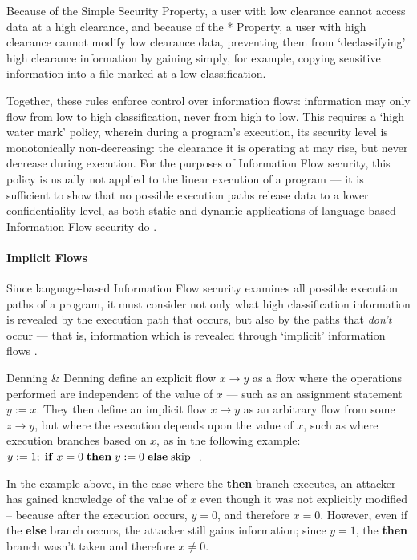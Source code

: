	Because of the Simple Security Property, a user with low clearance cannot access data at a high clearance, and because of the * Property, a user with high clearance cannot modify low clearance data, preventing them from `declassifying' high clearance information by gaining simply, for example, copying sensitive information into a file marked at a low classification.
	
	Together, these rules enforce control over information flows: information may only flow from low to high classification, never from high to low. This requires a `high water mark' \cite{jones1975highwatermark} policy, wherein during a program's execution, its security level is monotonically non-decreasing: the clearance it is operating at may rise, but never decrease during execution. For the purposes of Information Flow security, this policy is usually not applied to the linear execution of a program --- it is sufficient to show that no possible execution paths release data to a lower confidentiality level, as both static and dynamic applications of language-based Information Flow security do \cite{sabelfeld2003if}.
	
	\cite{denning1976lattice}
	
	\cite{sandhu1994access}
	
	\paragraph{Implicit Flows}
	
	Since language-based Information Flow security examines all possible execution paths of a program, it must consider not only what high classification information is revealed by the execution path that occurs, but also by the paths that \textit{don't} occur --- that is, information which is revealed through `implicit' information flows \cite{sabelfeld2003if}.
	
	Denning \& Denning \cite{denning1977if} define an explicit flow $ x \rightarrow y$ as a flow where the operations performed are independent of the value of $ x $ --- such as an assignment statement $ y := x $. They then define an implicit flow $ x \rightarrow y$ as an arbitrary flow from some $ z \rightarrow y $, but where the execution depends upon the value of $ x $, such as where execution branches based on $ x $, as in the following example: $ y := 1; \;\text{\textbf{if}}\; x = 0 \;\text{\textbf{then}}\; y := 0 \;\text{\textbf{else}}\; \text{skip}\;$ \cite{denning1977if}.
	
	In the example above, in the case where the \textbf{then} branch executes, an attacker has gained knowledge of the value of $ x $ even though it was not explicitly modified -- because after the execution occurs, $ y = 0 $, and therefore $ x = 0 $. However, even if the \textbf{else} branch occurs, the attacker still gains information; since $ y = 1 $, the \textbf{then} branch wasn't taken and therefore $ x \ne 0 $.
	
